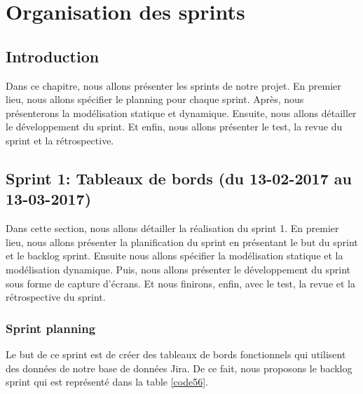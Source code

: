 \chapter{Organisation des sprints}
\section{Introduction}
Dans ce chapitre, nous allons présenter les sprints de notre projet. En premier lieu, nous allons spécifier le planning pour chaque sprint. Après, nous présenterons la modélisation statique et dynamique. Ensuite, nous allons détailler le développement du sprint. Et enfin, nous allons présenter le test, la revue du sprint et la rétrospective.

\section{Sprint 1: Tableaux de bords (du 13-02-2017 au 13-03-2017)}
Dans cette section, nous allons détailler la réalisation du sprint 1. En premier lieu, nous allons présenter la planification du sprint en présentant le but du sprint et le backlog sprint. Ensuite nous allons spécifier la modélisation statique et la modélisation dynamique. Puis, nous allons présenter le développement du sprint sous forme de capture d'écrans. Et nous finirons, enfin, avec le test, la revue et la rétrospective du sprint. 

\subsection{Sprint planning}
Le but de ce sprint est de créer des tableaux de bords fonctionnels qui utilisent des données de notre base de données Jira. De ce fait, nous proposons le backlog sprint qui est représenté dans la table \ref{code56}.

